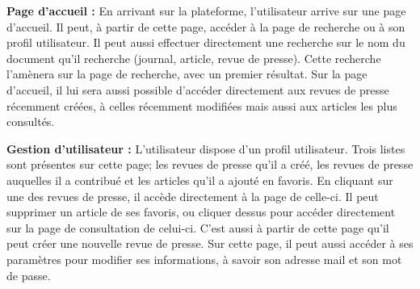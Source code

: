 	\textbf{Page d'accueil :} En arrivant sur la plateforme, l'utilisateur arrive sur une page d'accueil. Il peut, à partir de cette page, accéder à la page de recherche ou à son profil utilisateur. Il peut aussi effectuer directement une recherche sur le nom du document qu'il recherche (journal, article, revue de presse). Cette recherche l'amènera sur la page de recherche, avec un premier résultat. Sur la page d'accueil, il lui sera aussi possible d'accéder directement aux revues de presse récemment créées, à celles récemment modifiées mais aussi aux articles les plus consultés.

	\textbf{Gestion d'utilisateur :} L'utilisateur dispose d'un profil utilisateur. Trois listes sont présentes sur cette page; les revues de presse qu'il a créé, les revues de presse auquelles il a contribué et les articles qu'il a ajouté en favoris. En cliquant sur une des revues de presse, il accède directement à la page de celle-ci. Il peut supprimer un article de ses favoris, ou cliquer dessus pour accéder directement sur la page de consultation de celui-ci. C'est aussi à partir de cette page qu'il peut créer une nouvelle revue de presse. Sur cette page, il peut aussi accéder à ses paramètres pour modifier ses informations, à savoir son adresse mail et son mot de passe.